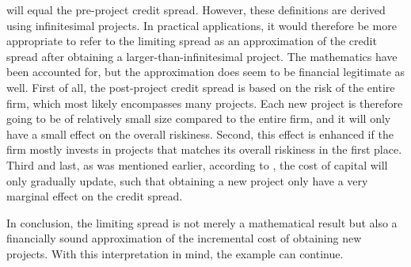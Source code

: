 \documentclass[main.tex]{subfiles}
\begin{document}
        will equal the pre-project credit spread.
        However, these definitions are derived using infinitesimal projects. 
        In practical applications,
        it would therefore be more appropriate to refer to the limiting spread as an approximation 
        of the credit spread after obtaining a larger-than-infinitesimal project.
        The mathematics have been accounted for, 
        but the approximation does seem to be financial legitimate as well.
        First of all, the post-project credit spread is based on the risk of the entire firm,
        which most likely encompasses many projects.
        Each new project is therefore going to be of relatively small size compared
        to the entire firm, and it will only have a small effect on the overall riskiness.
        Second, this effect is enhanced if the firm mostly invests in projects that matches
        its overall riskiness in the first place.
        Third and last, as was mentioned earlier, according to \textcite{Castagna2012FVA},
        the cost of capital will only gradually update, 
        such that obtaining a new project only have a very marginal effect on the credit spread.

        In conclusion, the limiting spread is not merely a mathematical result
        but also a financially sound approximation of the incremental cost of obtaining new projects.
        With this interpretation in mind, the example can continue.
\end{document}
